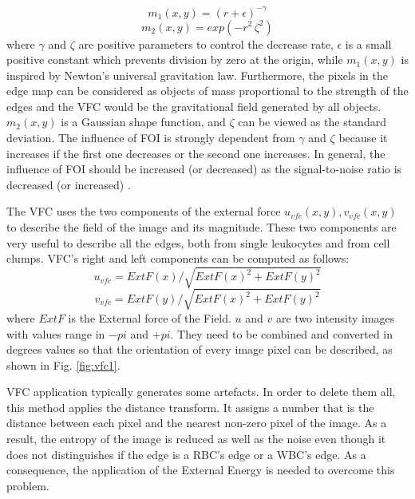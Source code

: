 \documentclass[final,a4paper,12pt,english]{UnicaPhdThesis3}
\begin{document}
\begin{equation}
{m} _{1} ( x,y ) =(r+\epsilon) ^{-\gamma}
\end{equation}
\begin{equation}
{m} _{2} ( x,y ) =exp(-r^{2}\, \zeta ^{2})
\end{equation}
where $\gamma$ and $\zeta$ are positive parameters to control the decrease rate, $\epsilon$ is a small positive constant which prevents division by zero at the origin, while ${m} _{1} ( x,y )$ is inspired by Newton's universal gravitation law. Furthermore, the pixels in the edge map can be considered as objects of mass proportional to the strength of the edges and the VFC would be the gravitational field generated by all objects. 
${m} _{2} ( x,y )$ is a Gaussian shape function, and $\zeta$ can be viewed as the standard deviation.
The influence of FOI is strongly dependent from $\gamma$ and $\zeta$ because it increases if the first one decreases or the second one increases. 
In general, the influence of FOI should be increased (or decreased) as the signal-to-noise ratio is decreased (or increased) \cite{Bing}.

The VFC uses the two components of the external force ${u} _{vfc} ( x,y ) , {v} _{vfc} (x,y)$ to describe the field of the image and its magnitude. These two components are very useful to describe all the edges, both from single leukocytes and from cell clumps. VFC's right and left components can be computed as follows:
\begin{equation}
{u} _{vfc}=ExtF(x)/\sqrt{ExtF(x)^{2} + ExtF(y)^{2}}
\end{equation}
\begin{equation}
{v} _{vfc}=ExtF(y)/\sqrt{ExtF(x)^{2} + ExtF(y)^{2}}
\end{equation}
where $ExtF$ is the External force of the Field. $u$ and $v$ are two intensity images with values range in $-pi$ and $+pi$. They need to be combined and converted in degrees values so that the orientation of every image pixel can be described, as shown in Fig. \ref{fig:vfc1}. 

VFC application typically generates some artefacts. In order to delete them all, this method applies the distance transform. It assigns a number that is the distance between each pixel and the nearest non-zero pixel of the image. As a result, the entropy of the image is reduced as well as the noise even though it does not distinguishes if the edge is a RBC's edge or a WBC's edge. As a consequence, the application of the External Energy is needed to overcome this problem.
\end{document}
